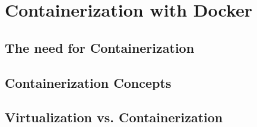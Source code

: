 \chapter{Containerization with Docker}
\label{cha:containerization-docker}

\section{The need for Containerization}
\label{sec:docker-containerization}

\section{Containerization Concepts}
\label{sec:docker-concepts}

\section{Virtualization vs. Containerization}
\label{sec:docker-virtualization-vs-containerization}